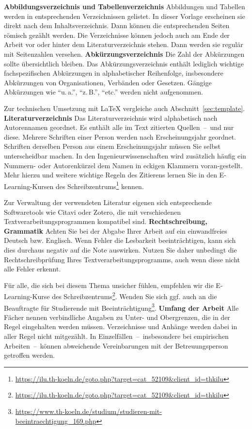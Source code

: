 %
%
\textbf{Abbildungsverzeichnis und Tabellenverzeichnis}
Abbildungen und Tabellen werden in entsprechenden Verzeichnissen gelistet. In dieser Vorlage erscheinen sie direkt nach dem Inhaltsverzeichnis. Dann können die entsprechenden Seiten römisch gezählt werden. Die Verzeichnisse können jedoch auch am Ende der Arbeit vor oder hinter dem Literaturverzeichnis stehen. Dann werden sie regulär mit Seitenzahlen versehen.
%
%
\textbf{Abkürzungsverzeichnis}
Die Zahl der Abkürzungen sollte übersichtlich bleiben. Das Abkürzungsverzeichnis enthält lediglich wichtige fachspezifischen Abkürzungen in alphabetischer Reihenfolge, insbesondere Abkürzungen von Organisationen, Verbänden oder Gesetzen. Gängige Abkürzungen wie \enquote{u.\,a.}, \enquote{z.\,B.}, \enquote{etc.} werden nicht aufgenommen.
\par
Zur technischen Umsetzung mit \LaTeX{} vergleiche auch Abschnitt~\ref{sec:template}.
%
%
\textbf{Literaturverzeichnis}
Das Literaturverzeichnis wird alphabetisch nach Autorennamen geordnet. Es enthält alle im Text zitierten Quellen~--~und nur diese. Mehrere Schriften einer Person werden nach Erscheinungsjahr geordnet. Schriften derselben Person aus einem Erscheinungsjahr müssen Sie selbst unterscheidbar machen. In den Ingenieurwissenschaften wird zusätzlich häufig ein Nummern- oder Autorenkürzel dem Namen in eckigen Klammern voran-gestellt. Mehr hierzu und weitere wichtige Regeln des Zitierens lernen Sie in den E-Learning-Kursen des Schreibzentrums\footnote{\href{https://ilu.th-koeln.de/goto.php?target=cat\_52109\&client\_id=thkilu}{https://ilu.th-koeln.de/goto.php?target=cat\_52109\&client\_id=thkilu}} kennen.
\par
Zur Verwaltung der verwendeten Literatur eigenen sich entsprechende Softwaretools wie Citavi oder Zotero, die mit verschiedenen Textverarbeitungsprogrammen kompatibel sind.
%
%
\textbf{Rechtschreibung, Grammatik}
Achten Sie bei der Abgabe Ihrer Arbeit auf ein einwandfreies Deutsch bzw. Englisch. Wenn Fehler die Lesbarkeit beeinträchtigen, kann sich dies durchaus negativ auf die Note auswirken. Nutzen Sie daher unbedingt die Rechtschreibprüfung Ihres Textverarbeitungsprogramms, auch wenn diese nicht alle Fehler erkennt.
\par
Für alle, die sich bei diesem Thema unsicher fühlen, empfehlen wir die E-Learning-Kurse des Schreibzentrums\footnote{\href{https://ilu.th-koeln.de/goto.php?target=cat\_52109\&client\_id=thkilu}{https://ilu.th-koeln.de/goto.php?target=cat\_52109\&client\_id=thkilu}}. Wenden Sie sich ggf. auch an die Beauftragte für Studierende mit Beeinträchtigung\footnote{\href{https://www.th-koeln.de/studium/studieren-mit-beeintraechtigung\_169.php}{https://www.th-koeln.de/studium/studieren-mit-beeintraechtigung\_169.php}}.
%
%
\textbf{Umfang der Arbeit}
Alle Fächer nennen verbindliche Angaben zu Unter- und Obergrenzen, die in der Regel eingehalten werden müssen. Verzeichnisse und Anhänge werden dabei in aller Regel nicht mitgezählt. In Einzelfällen~--~insbesondere bei empirischen Arbeiten~--~können abweichende Vereinbarungen mit der Betreuungsperson getroffen werden.